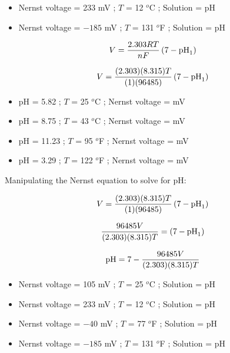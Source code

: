 \vskip 30pt

\begin{itemize}
\item{} Nernst voltage = 233 mV ; $T$ = 12 $^{o}$C ; Solution =  pH
\vskip 5pt
\item{} Nernst voltage = $-185$ mV ; $T$ = 131 $^{o}$F ; Solution =  pH
\end{itemize}







$$V = {{2.303 R T} \over {nF}} \left(7 - \hbox{pH}_1 \right)$$

$$V = {{(2.303) (8.315) T} \over {(1)(96485)}} \left(7 - \hbox{pH}_1 \right)$$

\begin{itemize}
\item{} pH = 5.82 ; $T$ = 25 $^{o}$C ; Nernst voltage =  mV
\vskip 5pt
\item{} pH = 8.75 ; $T$ = 43 $^{o}$C ; Nernst voltage =  mV
\vskip 5pt
\item{} pH = 11.23 ; $T$ = 95 $^{o}$F ; Nernst voltage =  mV
\vskip 5pt
\item{} pH = 3.29 ; $T$ = 122 $^{o}$F ; Nernst voltage =  mV
\end{itemize}

\vskip 10pt

\filbreak

Manipulating the Nernst equation to solve for pH:

$$V = {{(2.303) (8.315) T} \over {(1)(96485)}} \left(7 - \hbox{pH}_1 \right)$$

$${{96485 V} \over {(2.303) (8.315) T}} = \left(7 - \hbox{pH}_1 \right)$$

$$\hbox{pH} = 7 - {{96485 V} \over {(2.303) (8.315) T}}$$

\begin{itemize}
\item{} Nernst voltage = 105 mV ; $T$ = 25 $^{o}$C ; Solution =  pH
\vskip 5pt
\item{} Nernst voltage = 233 mV ; $T$ = 12 $^{o}$C ; Solution =  pH
\vskip 5pt
\item{} Nernst voltage = $-40$ mV ; $T$ = 77 $^{o}$F ; Solution =  pH
\vskip 5pt
\item{} Nernst voltage = $-185$ mV ; $T$ = 131 $^{o}$F ; Solution =  pH
\end{itemize}





